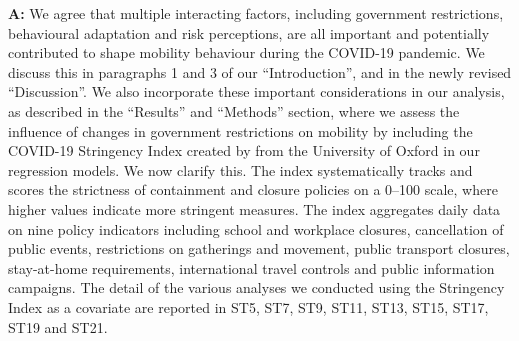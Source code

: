 \documentclass[12pt,a4paper,oneside, reqno]{amsart}
\begin{document}
\setlength{\leftskip}{1cm}\textbf{A:} We agree that multiple interacting factors, including government restrictions, behavioural adaptation and risk perceptions, are all important and potentially contributed to shape mobility behaviour during the COVID-19 pandemic. We discuss this in paragraphs 1 and 3 of our ``Introduction'', and in the newly revised ``Discussion''.  We also incorporate these important considerations in our analysis, as described in the ``Results'' and ``Methods'' section, where we assess the influence of changes in government restrictions on mobility by including the COVID-19 Stringency Index created by \parencite{hale2021global} from the University of Oxford in our regression models. We now clarify this. The index systematically tracks and scores the strictness of containment and closure policies on a 0–100 scale, where higher values indicate more stringent measures. The index aggregates daily data on nine policy indicators including school and workplace closures, cancellation of public events, restrictions on gatherings and movement, public transport closures, stay-at-home requirements, international travel controls and public information campaigns. The detail of the various analyses we conducted using the Stringency Index as a covariate are reported in ST5, ST7, ST9, ST11, ST13, ST15, ST17, ST19 and ST21.
\end{document}
